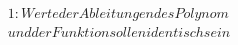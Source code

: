 \documentclass[preview]{standalone}
\begin{document}
\begin{align*}
1: {Werte der Ableitungen des Polynom} \\ {und der Funktion sollen identisch sein}
\end{align*}
\end{document}
